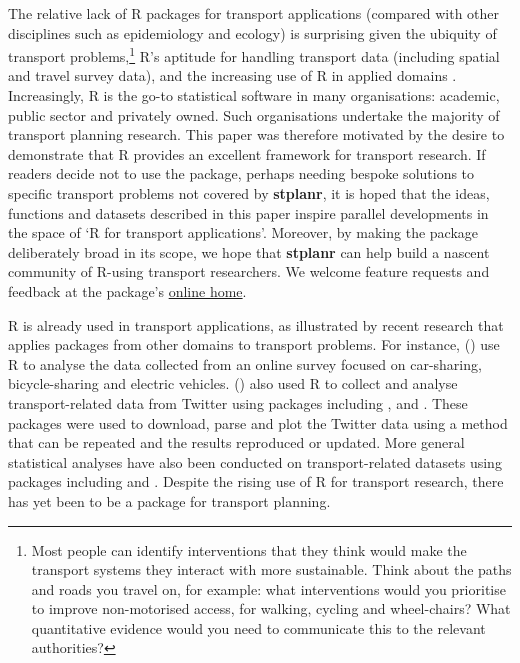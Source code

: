 The relative lack of R packages for transport applications
(compared with other disciplines such as epidemiology
and ecology) is surprising given the ubiquity of transport
problems,\footnote{Most people can identify interventions that they
  think would make the transport systems they interact with more
  sustainable. Think about the paths and roads you travel on, for
  example: what interventions would you prioritise to improve
  non-motorised access, for walking, cycling and wheel-chairs? What
  quantitative evidence would you need to communicate this to the
  relevant authorities?} R's aptitude for handling transport data
(including spatial and travel survey data), and the increasing use of R
in applied domains \citep{jalal_overview_2017,moore_why_2017}.
Increasingly, R is the go-to statistical software in
many organisations: academic, public sector and privately owned. Such
organisations undertake the majority of transport planning research.
This paper was therefore motivated by the desire to demonstrate that R
provides an excellent framework for transport research. If readers
decide not to use the package, perhaps needing bespoke solutions to
specific transport problems not covered by \textbf{stplanr}, it is hoped
that the ideas, functions and datasets described in this paper inspire
parallel developments in the space of `R for transport applications'.
Moreover, by making the package deliberately broad in its scope, we hope
that \textbf{stplanr} can help build a nascent community of R-using
transport researchers. We welcome feature requests and feedback at the
package's \href{https://github.com/ropensci/stplanr/issues}{online
home}.

R is already used in transport applications, as illustrated by recent
research that applies packages from other domains to transport problems.
For instance, \citeauthor{efthymiou_use_2012}
(\citeyear{efthymiou_use_2012}) use R to analyse the data collected from
an online survey focused on car-sharing, bicycle-sharing and electric
vehicles. \citeauthor{efthymiou_use_2012}
(\citeyear{efthymiou_use_2012}) also used R to collect and analyse
transport-related data from Twitter using packages including
,  and . These packages
were used to download, parse and plot the Twitter data using a method
that can be repeated and the results reproduced or updated. More general
statistical analyses have also been conducted on transport-related
datasets using packages including  and 
\citep{diana_studying_2012,cerin_walking_2013}. Despite the rising use
of R for transport research, there has yet been to be a package for
transport planning.

